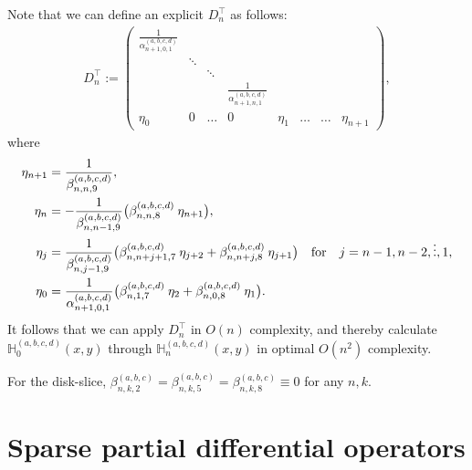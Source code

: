 \documentclass[11pt, oneside]{article}   	%
\newcommand{\hdop}{H}
\newcommand{\bighdop}{\mathbb{\hdop}}
\newcommand{\Dnt}{D^\top_n}
\newcommand{\betaabc}{\beta^{(a,b,c)}}
\newcommand{\alphaabcd}{\alpha^{(a,b,c,d)}}
\newcommand{\betaabcd}{\beta^{(a,b,c,d)}}
\newcommand{\bighdopabcd}{\bighdop^{(a,b,c,d)}}
\begin{document}
Note that we can define an explicit \(\Dnt\) as follows:
\begin{align*}
\Dnt := \begin{pmatrix}
		\frac{1}{\alphaabcd_{n+1,0,1}} & &  \\
		& \ddots & & &  \\
		& & \ddots & & \\
		& & & \frac{1}{\alphaabcd_{n+1,n,1}} & \\
		\eta_{0} & 0 & \hdots & 0 & \eta_{1} & \hdots & \hdots & \eta_{n+1}
	    \end{pmatrix},
\end{align*}
 where
 \begin{align*}
	\eta_{n+1} &= \frac{1}{\betaabcd_{n,n,9}}, \\ 
	\eta_{n} &= -\frac{1}{\betaabcd_{n,n-1,9}} \big( \betaabcd_{n,n,8} \: \eta_{n+1} \big), \\
	\eta_j &= \frac{1}{\betaabcd_{n,j-1,9}} \big( \betaabcd_{n,n+j+1,7} \: \eta_{j+2} + \betaabcd_{n,n+j,8} \: \eta_{j+1} \big) \qfor j = n-1,n-2,\dots,1, \\
	\eta_0 &= \frac{1}{\alphaabcd_{n+1,0,1}} \big( \betaabcd_{n,1,7} \: \eta_{2} + \betaabcd_{n,0,8} \: \eta_{1} \big).
\end{align*}
It follows that we can apply $\Dnt$ in $O(n)$ complexity, and thereby calculate $\bighdopabcd_{0}(x,y)$  through $\bighdopabcd_{n}(x,y)$ in optimal $O(n^2)$ complexity.

For the disk-slice, $\betaabc_{n,k,2} = \betaabc_{n,k,5} = \betaabc_{n,k,8} \equiv 0$ for any $n, k$.

%
\section{Sparse partial differential operators}\label{Section:PDOs}
\end{document}
